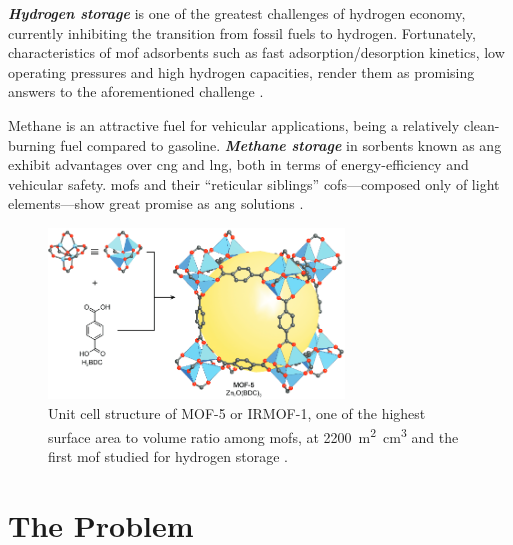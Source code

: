 \emph{\bfseries Hydrogen storage} is one of the greatest
challenges of hydrogen economy, currently inhibiting the transition from fossil
fuels to hydrogen. Fortunately, characteristics of \gls{mof} adsorbents such as
fast adsorption/desorption kinetics, low operating pressures and high hydrogen
capacities, render them as promising answers to the aforementioned challenge
\parencite{Suh2011, Suresh_2021}.

Methane is an attractive fuel for vehicular applications, being a relatively
clean-burning fuel compared to gasoline. \emph{\bfseries Methane
storage} in sorbents known as \gls{ang} exhibit
advantages over \gls{cng} and \gls{lng}, both in terms of energy-efficiency and
vehicular safety. \glspl{mof} \parencite{Ma2007, Spanopoulos_2016,
Tsangarakis2023} and their ``reticular siblings'' \glspl{cof}---composed only of light elements---show great promise as
\gls{ang} solutions \parencite{MendozaCortes2011, Furukawa_2009, Martin2014,
Tong2018}.

\begin{figure}
	\centering
	\includegraphics[width=0.7\textwidth]{fig/irmof-1.png}
	\caption[Unit cell structure of IRMOF-1.]{Unit cell
	structure of MOF-5 or IRMOF-1, one of the
	highest surface area to volume ratio among \glspl{mof},
	at \SI{2200}{\square\meter\cubic\centi\meter} and the first \gls{mof}
	studied for hydrogen storage \parencite{Rosi2003}.}
	\label{fig:irmof-1}
\end{figure}

\section{The Problem}

